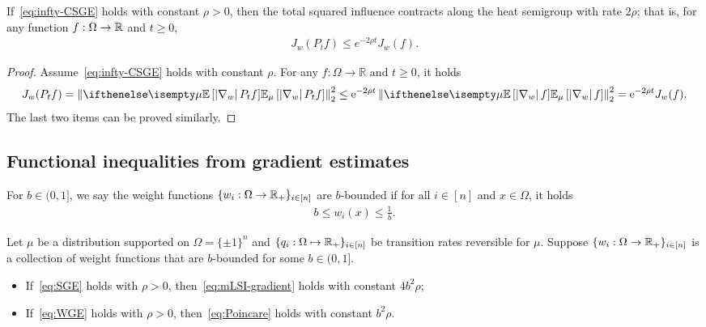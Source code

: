 \begin{proposition}
    If~\ref{eq:infty-CSGE} holds with constant $\rho > 0$, then the total squared influence contracts along the heat semigroup with rate $2\rho$; that is, for any function $f: \Omega \to \mathbb{R}$ and $t \ge 0$,
    \begin{align*}
        J_w(P_t f) \leq e^{-2\rho t} J_w(f). \tag{$J$-contraction}
    \end{align*} 
\end{proposition}

\begin{proof}
    Assume~\ref{eq:infty-CSGE} holds with constant $\rho$. For any $f:\Omega \to \mathbb{R}$ and $t \ge 0$, it holds
    \begin{align*}
        J_w(P_t f) = \norm{\E[\mu]{\abs{\nabla_w} P_t f}}_2^2 \le \e^{-2\rho t} \norm{\E[\mu]{\abs{\nabla_w} f}}_2^2 = \e^{-2 \rho t} J_w(f).
    \end{align*}
    The last two items can be proved similarly.
\end{proof}


\subsection{Functional inequalities from gradient estimates}
\begin{definition}
    For $b \in (0,1]$, we say the weight functions $\{w_i:\Omega \to \mathbb{R}_+\}_{i\in[n]}$ are $b$-bounded if for all $i \in [n]$ and $x \in \Omega$, it holds
    \begin{align}\label{eq:w_lower_bound}
        b \le w_i(x) \le \frac{1}{b}.
    \end{align}
\end{definition}

\begin{proposition}
    Let $\mu$ be a distribution supported on $\Omega = \{\pm 1\}^n$ and $\{q_i: \Omega \mapsto \mathbb{R}_+\}_{i\in[n]}$ be transition rates reversible for $\mu$.
    Suppose $\{w_i:\Omega \to \mathbb{R}_+\}_{i\in[n]}$ is a collection of weight functions 
    that are $b$-bounded for some $b \in (0,1]$.
    \begin{itemize}
        \item If~\ref{eq:SGE} holds with $\rho > 0$, then~\ref{eq:mLSI-gradient} holds with constant $4b^2\rho$;
        \item If~\ref{eq:WGE} holds with $\rho > 0$, then~\ref{eq:Poincare} holds with constant $b^2\rho$.
    \end{itemize}
\end{proposition}

